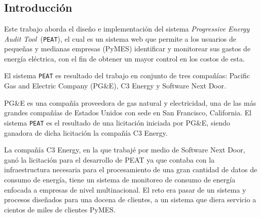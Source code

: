 \documentclass[letterpaper,twoside,openright]{book}
\begin{document}
\tableofcontents

\chapter*{}
\section*{Introducción}
Este trabajo aborda el diseño e implementación del sistema \textit{Progressive
  Energy Audit Tool}\ (\texttt{PEAT}), el cual es un sistema web que permite
a los usuarios de pequeñas y medianas empresas (PyMES) identificar y monitorear
sus gastos de energía eléctrica, con el fin de obtener un mayor control
en los costos de esta.

El sistema \texttt{PEAT} es resultado del trabajo en conjunto de tres compañías:
Pacific Gas and Electric Company (PG\&E), C3 Energy y Software Next Door.

PG\&E es una compañía proveedora de gas natural y electricidad, una de las
más grandes compañías de Estados Unidos con sede en San Francisco, California.
El sistema \texttt{PEAT} es el resultado de una licitación iniciada por PG\&E,
siendo ganadora de dicha licitación la compañía C3 Energy.

La compañía C3 Energy, en la que trabajé por medio de Software Next Door, ganó
la licitación para el desarrollo de PEAT ya que contaba con la infraestructura
necesaria para el procesamiento de una gran cantidad de datos de consumo
de energía, tiene un sistema de monitoreo de consumo de energía enfocada a
empresas de nivel multinacional. El reto era pasar de un sistema y
procesos diseñados para una docena de clientes, a un sistema que diera servicio
a cientos de miles de clientes PyMES.


\mainmatter



\backmatter
\nocite{*}


\end{document}
